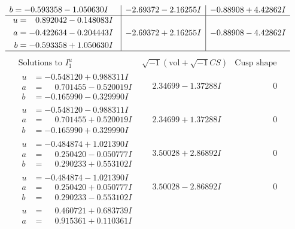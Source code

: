 \documentclass[1p]{elsarticle_modified}
\theoremstyle{definition}
\newcommand{\I}{\sqrt{-1}}
\begin{document}
$$\begin{array}{c|c|c}
\begin{aligned}
b &= -0.593358 - 1.050630 I\end{aligned}
 & -2.69372 - 2.16255 I & -0.88908 + 4.42862 I \\ \hline\begin{aligned}
u &= \phantom{-}0.892042 - 0.148083 I \\
a &= -0.422634 - 0.204443 I \\
b &= -0.593358 + 1.050630 I\end{aligned}
 & -2.69372 + 2.16255 I & -0.88908 - 4.42862 I\\
 \hline 
 \end{array}$$\newpage$$\begin{array}{c|c|c}  
\text{Solutions to }I^u_{1}& \I (\text{vol} + \sqrt{-1}CS) & \text{Cusp shape}\\
 \hline 
\begin{aligned}
u &= -0.548120 + 0.988311 I \\
a &= \phantom{-}0.701455 - 0.520019 I \\
b &= -0.165990 - 0.329990 I\end{aligned}
 & \phantom{-}2.34699 - 1.37288 I & \phantom{-0.000000 } 0 \\ \hline\begin{aligned}
u &= -0.548120 - 0.988311 I \\
a &= \phantom{-}0.701455 + 0.520019 I \\
b &= -0.165990 + 0.329990 I\end{aligned}
 & \phantom{-}2.34699 + 1.37288 I & \phantom{-0.000000 } 0 \\ \hline\begin{aligned}
u &= -0.484874 + 1.021390 I \\
a &= \phantom{-}0.250420 - 0.050777 I \\
b &= \phantom{-}0.290233 + 0.553102 I\end{aligned}
 & \phantom{-}3.50028 + 2.86892 I & \phantom{-0.000000 } 0 \\ \hline\begin{aligned}
u &= -0.484874 - 1.021390 I \\
a &= \phantom{-}0.250420 + 0.050777 I \\
b &= \phantom{-}0.290233 - 0.553102 I\end{aligned}
 & \phantom{-}3.50028 - 2.86892 I & \phantom{-0.000000 } 0 \\ \hline\begin{aligned}
u &= \phantom{-}0.460721 + 0.683739 I \\
a &= \phantom{-}0.915361 + 0.110361 I \\

\end{aligned}
\end{array}$$
\end{document}
